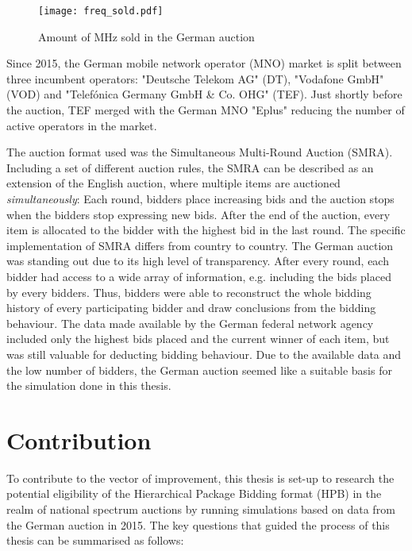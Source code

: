 \begin{figure}[h]
	\centering
	\texttt{[image: freq\_sold.pdf]}\\
	\caption{Amount of MHz sold in the German auction} \label{fig:freq-sold}
\end{figure}

Since 2015, the German mobile network operator (MNO) market is split between three incumbent operators: "Deutsche Telekom AG" (DT), "Vodafone GmbH" (VOD) and "Telefónica Germany GmbH \& Co. OHG" (TEF). Just shortly before the auction, TEF merged with the German MNO "Eplus" reducing the number of active operators in the market. 

The auction format used was the Simultaneous Multi-Round Auction (SMRA). Including a set of different auction rules, the SMRA can be described as an extension of the English auction, where multiple items are auctioned \textit{simultaneously}: Each round, bidders place increasing bids and the auction stops when the bidders stop expressing new bids. After the end of the auction, every item is allocated to the bidder with the highest bid in the last round.
The specific implementation of SMRA differs from country to country. The German auction was standing out due to its high level of transparency. After every round, each bidder had access to a wide array of information, e.g. including the bids placed by every bidders. Thus, bidders were able to reconstruct the whole bidding history of every participating bidder and draw conclusions from the bidding behaviour. The data made available by the German federal network agency included only the highest bids placed and the current winner of each item, but was still valuable for deducting bidding behaviour.
Due to the available data and the low number of bidders, the German auction seemed like a suitable basis for the simulation done in this thesis.



\section{Contribution}
To contribute to the vector of improvement, this thesis is set-up to research the potential eligibility of the Hierarchical Package Bidding format (HPB) in the realm of national spectrum auctions by running simulations based on data from the German auction in 2015. The key questions that guided the process of this thesis can be summarised as follows:

